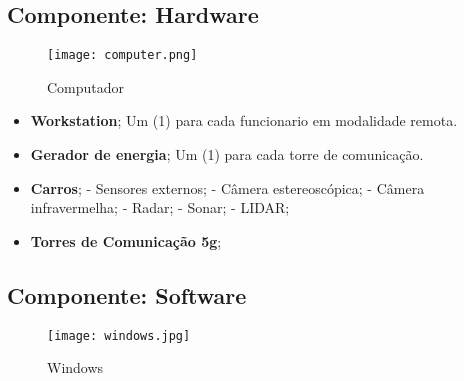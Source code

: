 \subsection{Componente: Hardware} \label{Hardware}
\begin{figure}[H]
       \begin{center}
              \texttt{[image: computer.png]}
              \caption{Computador} \label{sistema}
       \end{center}
\end{figure}


\begin{itemize}


       \item \textbf{Workstation};
       \subitem Um (1) para cada funcionario em modalidade remota.
       \item \textbf{Gerador de energia};
       \subitem Um (1) para cada torre de comunicação.
       \item \textbf{Carros};
       \subitem - Sensores externos;
       \subitem - Câmera estereoscópica;
       \subitem - Câmera infravermelha;
       \subitem - Radar;
       \subitem - Sonar;
       \subitem - LIDAR;
       \item \textbf{Torres de Comunicação 5g};


\end{itemize}

\subsection{Componente: Software}
\begin{figure}[H]
       \begin{center}
              \texttt{[image: windows.jpg]}
              \caption{Windows} \label{sistema}
       \end{center}
\end{figure}

